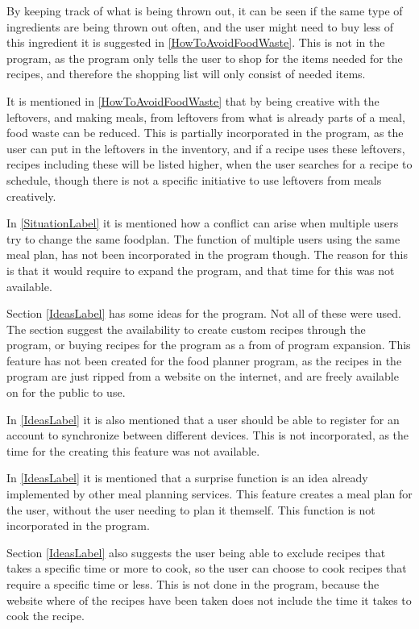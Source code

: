 By keeping track of what is being thrown out, it can be seen if the same type of ingredients are being thrown out often, and the user might need to buy less of this ingredient it is suggested in \cref{HowToAvoidFoodWaste}. This is not in the program, as the program only tells the user to shop for the items needed for the recipes, and therefore the shopping list will only consist of needed items. 

It is mentioned in \cref{HowToAvoidFoodWaste} that by being creative with the leftovers, and making meals, from leftovers from what is already parts of a meal, food waste can be reduced. This is partially incorporated in the program, as the user can put in the leftovers in the inventory, and if a recipe uses these leftovers, recipes including these will be listed higher, when the user searches for a recipe to schedule, though there is not a specific initiative to use leftovers from meals creatively.

In \cref{SituationLabel} it is mentioned how a conflict can arise when multiple users try to change the same foodplan. The function of multiple users using the same meal plan, has not been incorporated in the program though. The reason for this is that it would require to expand the program, and that time for this was not available.

Section \ref{IdeasLabel} has some ideas for the program. Not all of these were used. The section suggest the availability to create custom recipes through the program, or buying recipes for the program as a from of program expansion. This feature has not been created for the food planner program, as the recipes in the program are just ripped from a website on the internet, and are freely available on for the public to use.

In \cref{IdeasLabel} it is also mentioned that a user should be able to register for an account to synchronize between different devices. This is not incorporated, as the time for the creating this feature was not available.

In \cref{IdeasLabel} it is mentioned that a surprise function is an idea already implemented by other meal planning services. This feature creates a meal plan for the user, without the user needing to plan it themself. This function is not incorporated in the program.

Section \ref{IdeasLabel} also suggests the user being able to exclude recipes that takes a specific time or more to cook, so the user can choose to cook recipes that require a specific time or less. This is not done in the program, because the website where of the recipes have been taken does not include the time it takes to cook the recipe.

